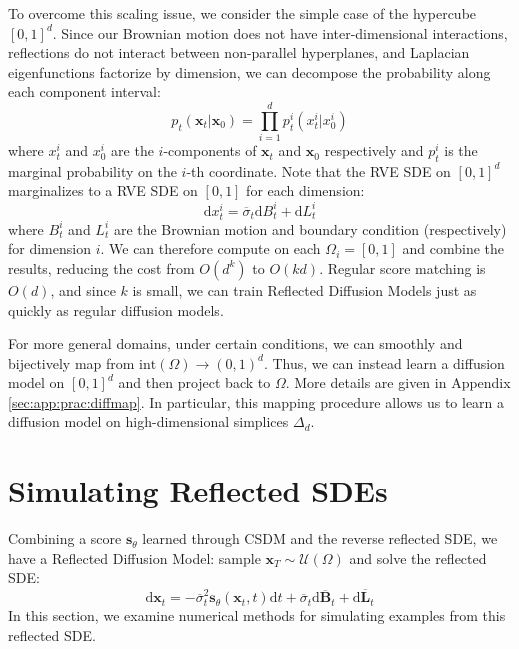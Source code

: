 \documentclass{article}
\theoremstyle{plain}
\theoremstyle{definition}
\theoremstyle{remark}
\renewcommand{\vec}{\mathbf}
\newcommand{\dd}{\mathrm{d}}
\begin{document}
To overcome this scaling issue, we consider the simple case of the hypercube $[0, 1]^d$. Since our Brownian motion does not have inter-dimensional interactions, reflections do not interact between non-parallel hyperplanes, and Laplacian eigenfunctions factorize by dimension, we can decompose the probability along each component interval:
\begin{equation}
    p_t(\vec{x}_t | \vec{x}_0) = \prod_{i = 1}^d p_t^i(x_t^i | x_0^i) 
\end{equation}
where $x_t^i$ and $x_0^i$ are the $i$-components of $\vec{x}_t$ and $\vec{x}_0$ respectively and $p_t^i$ is the marginal probability on the $i$-th coordinate. Note that the RVE SDE on $[0, 1]^d$ marginalizes to a RVE SDE on $[0, 1]$ for each dimension:
\begin{equation}
    \dd x_t^i = \overline{\sigma}_t \dd B_t^i + \dd L_t^i
\end{equation}
where $B_t^i$ and $L_t^i$ are the Brownian motion and boundary condition (respectively) for dimension $i$. We can therefore compute on each $\Omega_i = [0, 1]$ and combine the results, reducing the cost from $O(d^k)$ to $O(kd)$. Regular score matching is $O(d)$, and since $k$ is small, we can train Reflected Diffusion Models just as quickly as regular diffusion models.

For more general domains, under certain conditions, we can smoothly and bijectively map from $\mathrm{int}(\Omega) \to (0, 1)^d$. Thus, we can instead learn a diffusion model on $[0, 1]^d$ and then project back to $\Omega$. More details are given in Appendix \ref{sec:app:prac:diffmap}. In particular, this mapping procedure allows us to learn a diffusion model on high-dimensional simplices $\Delta_d$.
%
 \section{Simulating Reflected SDEs}

Combining a score $\vec{s}_\theta$ learned through CSDM and the reverse reflected SDE, we have a Reflected Diffusion Model: sample $\vec{x}_T \sim \mathcal{U}(\Omega)$ and solve the reflected SDE:
\begin{equation}\label{eqn:refldiffmodel}
    \dd \vec{x}_t = -\overline{\sigma}_t^2 \vec{s}_\theta(\vec{x}_t, t) \dd t+ \overline{\sigma}_t \dd \overline{\vec{B}}_t + \dd \overline{\vec{L}}_t
\end{equation}
In this section, we examine numerical methods for simulating examples from this reflected SDE.
\end{document}
